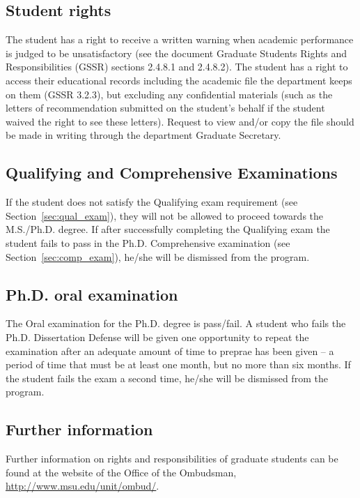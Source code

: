 \subsection{Student rights}

The student has a right to receive a written warning when academic
performance is judged to be unsatisfactory (see the document Graduate
Students Rights and Responsibilities (GSSR) sections 2.4.8.1 and
2.4.8.2).  The student has a right to access their educational records
including the academic file the department keeps on them (GSSR 3.2.3),
but excluding any confidential materials (such as the letters of
recommendation submitted on the student's behalf if the student waived
the right to see these letters).  Request to view and/or copy the file
should be made in writing through the department Graduate Secretary.

\subsection{Qualifying and Comprehensive Examinations}

If the student does not satisfy the Qualifying exam requirement (see
Section~\ref{sec:qual_exam}), they will not be allowed to proceed
towards the M.S./Ph.D. degree.  If after successfully completing the
Qualifying exam the student fails to pass in the Ph.D. Comprehensive
examination (see Section~\ref{sec:comp_exam}), he/she will be
dismissed from the program.  

\subsection{Ph.D. oral examination}

The Oral examination for the Ph.D. degree is pass/fail.  A student who fails the Ph.D. Dissertation Defense will be given one
opportunity to repeat the examination after an
adequate amount of time to preprae has been given -- a period of time
that must be at least one month, but no more than six months.  If the student fails the exam a second
time, he/she will be dismissed from the program.

\subsection{Further information}

Further information on rights and responsibilities of graduate
students can be found at the website of the Office of the Ombudsman,
\url{http://www.msu.edu/unit/ombud/}.

 

